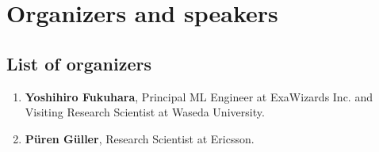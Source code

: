 \documentclass{article}
\def\c#1{\textcolor{gray}{#1}}
\begin{document}
\section{Organizers and speakers}
\subsection{List of organizers}

\begin{enumerate}
    \item {\bf Yoshihiro Fukuhara}, Principal ML Engineer at ExaWizards Inc. and Visiting Research Scientist at Waseda University.

    \item {\bf Püren Güller}, Research Scientist at Ericsson.


\end{enumerate}
\end{document}
